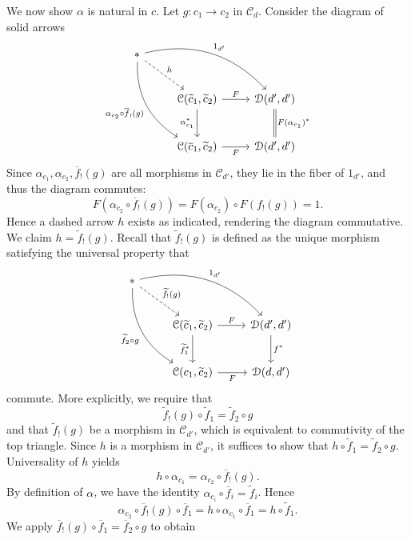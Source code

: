 We now show $\alpha $ is natural in $c$. Let $g : c_1 \to c_2$ in $\mathcal{C}_d$. Consider the diagram of solid arrows
\[\begin{tikzcd}[row sep = 2.5em, column sep = 2.5em]
* \ar[" 1_{d'}  ", bend left, drr] \ar[" \alpha _{c_2}  \circ \overline{f} _!(g) "', bend right, ddr] \ar[" h ", dashed, dr]  &  &  \\
 & \mathcal{C} (\widetilde{c} _1, \widetilde{c} _2)\ar[" \alpha_{c_1} ^* "', d] \ar[" F ", r]  & \mathcal{D} (d',d')\ar[" F(\alpha _{c_1} )^* ", equals, d]  \\
 & \mathcal{C} (\overline{c} _1, \widetilde{c} _2)\ar[" F "', r]  & \mathcal{D}(d',d')
\end{tikzcd}\]
Since $\alpha _{c_1} ,\alpha _{c_2} ,\overline{f} _!(g)$ are all morphisms in $\mathcal{C} _{d'} $, they lie in the fiber of $1_{d'} $, and thus the diagram commutes:
\[
	F(\alpha _{c_2}  \circ \overline{f} _{!} (g))=F(\alpha_{c_2} )\circ F(f_{!} (g))=1
.\]
Hence a dashed arrow $h$ exists as indicated, rendering the diagram commutative. We claim $h= \widetilde{f} _!(g)$. Recall that $\widetilde{f} _!(g)$ is defined as the unique morphism satisfying the universal property that
\[\begin{tikzcd}[row sep = 2.5em, column sep = 2.5em]
* \ar[" 1_{d'}  ", bend left, drr] \ar[" \widetilde{f}_2 \circ g "', bend right, ddr] \ar[" \widetilde{f} _!(g) ", dashed, dr]  &  &  \\
 & \mathcal{C} (\widetilde{c} _1,\widetilde{c}_2)\ar[" F ", r] \ar[" \widetilde{f}_1^* "', d]  & \mathcal{D} (d',d')\ar[" f^* ", d]  \\
 & \mathcal{C} (c_1, \widetilde{c} _2)\ar[" F "', r]  & \mathcal{D} (d,d')
\end{tikzcd}\]
commute. More explicitly, we require that
\[
	\widetilde{f} _!(g)\circ \widetilde{f} _1 = \widetilde{f} _2 \circ g
\]
and that $\widetilde{f} _!(g)$ be a morphism in $\mathcal{C} _{d'} $, which is equivalent to commutivity of the top triangle. Since $h$ is a morphism in $\mathcal{C} _{d'} $, it suffices to show that $h\circ \widetilde{f} _1 = \widetilde{f} _2 \circ g$. Universality of $h$ yields
\[
	h \circ \alpha _{c_1} = \alpha _{c_2} \circ \overline{f} _!(g)
.\]
By definition of $\alpha $, we have the identity $\alpha _{c_i}  \circ \overline{f} _i = \widetilde{f} _i$. Hence
\[
	\alpha _{c_2} \circ \overline{f} _!(g)\circ \overline{f} _1 = h \circ \alpha _{c_1} \circ \overline{f} _1 = h \circ \widetilde{f} _1
.\]
We apply $\overline{f} _!(g)\circ \overline{f} _1 = \overline{f} _2 \circ g$ to obtain

